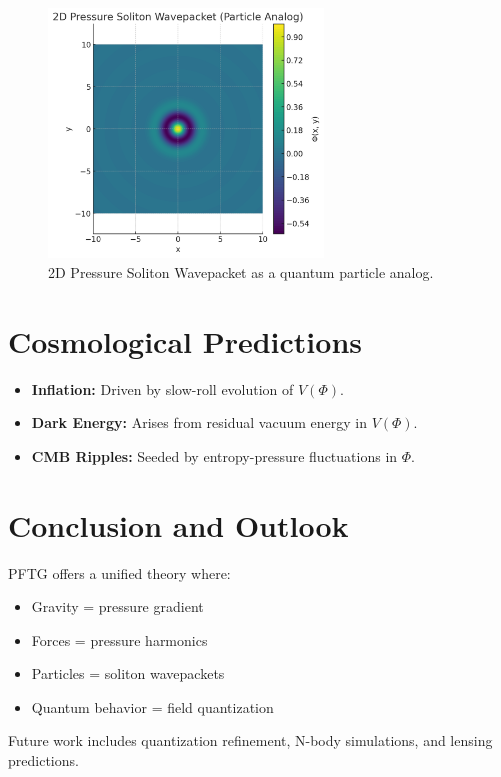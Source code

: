 \documentclass[12pt]{article}
\begin{document}
\begin{figure}[h]
\centering
\includegraphics[width=0.65\textwidth]{Soliton_Wavepacket.png}
\caption{2D Pressure Soliton Wavepacket as a quantum particle analog.}
\end{figure}

\section{Cosmological Predictions}
\begin{itemize}
    \item \textbf{Inflation:} Driven by slow-roll evolution of $V(\Phi)$.
    \item \textbf{Dark Energy:} Arises from residual vacuum energy in $V(\Phi)$.
    \item \textbf{CMB Ripples:} Seeded by entropy-pressure fluctuations in $\Phi$.
\end{itemize}

\section{Conclusion and Outlook}
PFTG offers a unified theory where:
\begin{itemize}
    \item Gravity = pressure gradient
    \item Forces = pressure harmonics
    \item Particles = soliton wavepackets
    \item Quantum behavior = field quantization
\end{itemize}

Future work includes quantization refinement, N-body simulations, and lensing predictions.
\end{document}
